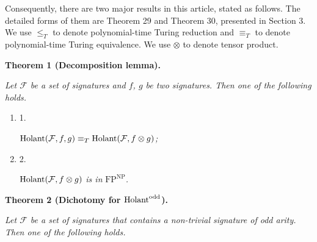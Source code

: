 \documentclass[10pt,a4paper]{article}
\begin{document}
Consequently, there are two major results in this article, stated as follows. The detailed forms of them are Theorem 29 and Theorem 30, presented in Section 3. We use $\leq_{T}$ to denote polynomial-time Turing reduction and $\equiv_{T}$ to denote polynomial-time Turing equivalence. We use $\otimes$ to denote tensor product.\par





\par\medskip\noindent\textbf{
\textbf{Theorem 1}\textbf{ }(Decomposition lemma)\textbf{.}
}\par



\emph{Let $\mathcal{F}$ be a set of signatures and $f$, $g$ be two signatures. Then one of the following holds.}\par


\begin{enumerate}


\item[] 
1. 


$\textup{{Holant}}(\mathcal{F},f,g)\equiv_{T}\textup{{Holant}}(\mathcal{F},f\otimes g)$\emph{;}\par





\item[] 
2. 


$\textup{{Holant}}(\mathcal{F},f\otimes g)$\emph{ is in }$\text{FP}^{\text{NP}}$\emph{.}\par





\end{enumerate}







\par\medskip\noindent\textbf{
\textbf{Theorem 2}\textbf{ }(Dichotomy for $\textup{{Holant}}^{\text{odd}}$)\textbf{.}
}\par



\emph{Let $\mathcal{F}$ be a set of signatures that contains a non-trivial signature of odd arity. Then one of the following holds.}\par
\end{document}
